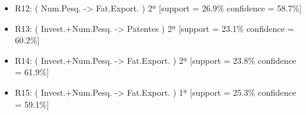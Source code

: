 \documentclass[kdmile,a4paper]{kdmile} %
\begin{document}
\begin{itemize}
    \item R12: ( Num.Pesq. -> Fat.Export. ) 2ª [support = 26.9\% confidence = 58.7\%]
    \item R13: ( Invest.+Num.Pesq. -> Patentes ) 2ª [support = 23.1\% confidence = 60.2\%]
    \item R14: ( Invest.+Num.Pesq. -> Fat.Export. ) 2ª [support = 23.8\% confidence = 61.9\%]
    \item R15: ( Invest.+Num.Pesq. -> Fat.Export. ) 1ª [support = 25.3\% confidence = 59.1\%]

\end{itemize}
\end{document}
